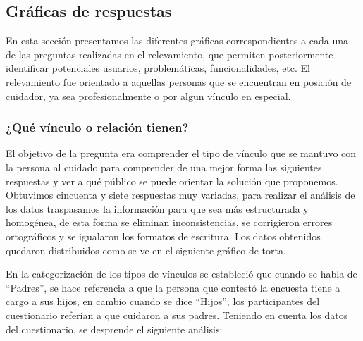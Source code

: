 \documentclass[a4paper,12pt]{article}
\begin{document}
    \subsection{Gráficas de respuestas}
    En esta sección presentamos las diferentes gráficas correspondientes a cada una de las preguntas realizadas en el relevamiento, que permiten posteriormente identificar potenciales usuarios, problemáticas, funcionalidades, etc.\newline
    El relevamiento fue orientado a aquellas personas que se encuentran en posición de cuidador, ya sea profesionalmente o por algun vínculo en especial.
    \subsubsection{¿Qué vínculo o relación tienen?}
    El objetivo de la pregunta era comprender el tipo de vínculo que se mantuvo con la persona al cuidado para comprender de una mejor forma las siguientes respuestas y ver a qué público se puede orientar la solución que proponemos. \newline
    Obtuvimos cincuenta y siete respuestas muy variadas, para realizar el análisis de los datos traspasamos la información para que sea más estructurada y homogénea, de esta forma se eliminan inconsistencias, se corrigieron errores ortográficos y se igualaron los formatos de escritura. \newline
    Los datos obtenidos quedaron distribuidos como se ve en el siguiente gráfico de torta. \newline
         \newline
    En la categorización de los tipos de vínculos se estableció que cuando se habla de “Padres”, se hace referencia a que la persona que contestó la encuesta tiene a cargo a sus hijos, en cambio cuando se dice “Hijos”, los participantes del cuestionario referían a que cuidaron a sus padres. \newline
    Teniendo en cuenta los datos del cuestionario, se desprende el siguiente análisis:
\end{document}
